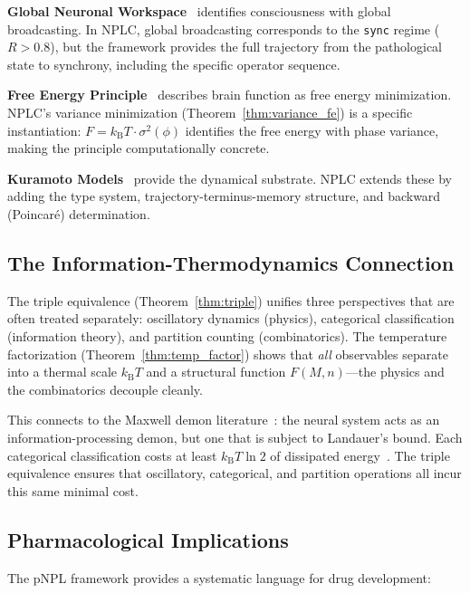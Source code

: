 \documentclass[10pt,twocolumn]{article}
\theoremstyle{remark}
\newcommand{\kB}{k_{\mathrm{B}}}
\begin{document}
\textbf{Global Neuronal Workspace}~\cite{dehaene2001towards,dehaene2014consciousness} identifies consciousness with global broadcasting. In NPLC, global broadcasting corresponds to the \texttt{sync} regime ($R > 0.8$), but the framework provides the full trajectory from the pathological state to synchrony, including the specific operator sequence.

\textbf{Free Energy Principle}~\cite{friston2010free} describes brain function as free energy minimization. NPLC's variance minimization (Theorem~\ref{thm:variance_fe}) is a specific instantiation: $F = \kB T \cdot \sigma^2(\phi)$ identifies the free energy with phase variance, making the principle computationally concrete.

\textbf{Kuramoto Models}~\cite{kuramoto1984chemical,strogatz2000kuramoto,acebron2005kuramoto} provide the dynamical substrate. NPLC extends these by adding the type system, trajectory-terminus-memory structure, and backward (Poincar\'{e}) determination.

\subsection{The Information-Thermodynamics Connection}

The triple equivalence (Theorem~\ref{thm:triple}) unifies three perspectives that are often treated separately: oscillatory dynamics (physics), categorical classification (information theory), and partition counting (combinatorics). The temperature factorization (Theorem~\ref{thm:temp_factor}) shows that \emph{all} observables separate into a thermal scale $\kB T$ and a structural function $F(M,n)$---the physics and the combinatorics decouple cleanly.

This connects to the Maxwell demon literature~\cite{szilard1929entropy,landauer1961irreversibility,bennett1982thermodynamics}: the neural system acts as an information-processing demon, but one that is subject to Landauer's bound. Each categorical classification costs at least $\kB T \ln 2$ of dissipated energy~\cite{landauer1961irreversibility}. The triple equivalence ensures that oscillatory, categorical, and partition operations all incur this same minimal cost.

\subsection{Pharmacological Implications}

The pNPL framework provides a systematic language for drug development:
\end{document}
